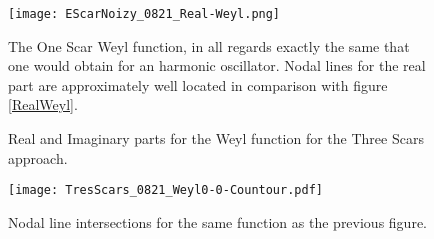 \documentclass[a4paper,12pt]{article}
\begin{document}
\begin{figure}
\begin{center}
  \texttt{[image: EScarNoizy\_0821\_Real-Weyl.png]}
\caption{The One Scar Weyl function, in all regards exactly the
same that one would obtain for an harmonic oscillator. Nodal lines for
the real part are approximately well located in comparison with figure 
\ref{RealWeyl}.}
\label{OneScar}
\end{center}
\end{figure}



\begin{figure}
\begin{center}
\caption{Real and Imaginary parts for the Weyl function for
the Three Scars approach. }
\label{ThreeScars}
\end{center}
\end{figure}





\begin{figure}
\begin{center}
  \texttt{[image: TresScars\_0821\_Weyl0-0-Countour.pdf]}
\caption{Nodal line intersections for the same function as the 
previous figure.}
\label{ThreeScarsNodal}
\end{center}
\end{figure}




\end{document}
